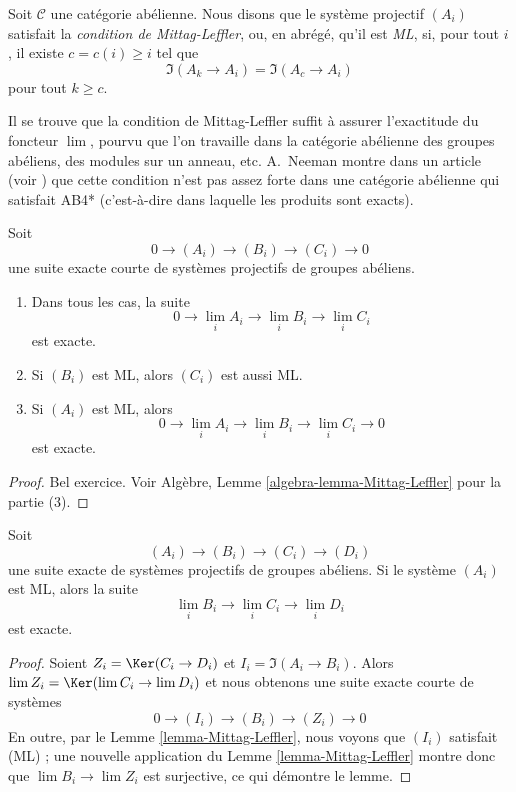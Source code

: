 \begin{definition}
\label{definition-Mittag-Leffler}
Soit $\mathcal{C}$ une catégorie abélienne.
Nous disons que le système projectif $(A_i)$
satisfait la {\it condition de Mittag-Leffler}, ou, en abrégé, qu'il est
{\it ML}, si, pour tout $i$, il existe $c = c(i) \geq i$
tel que
$$
\Im(A_k \to A_i) = \Im(A_c \to A_i)
$$
pour tout $k \geq c$.
\end{definition}

\noindent
Il se trouve que la condition de Mittag-Leffler suffit à assurer
l'exactitude du foncteur $\lim$, pourvu que l'on travaille dans
la catégorie abélienne des groupes abéliens, des modules sur un anneau, etc.
A.\ Neeman montre dans un article (voir \cite{Neeman-Counterexample})
que cette condition n'est pas assez forte dans une catégorie abélienne
qui satisfait AB4* (c'est-à-dire dans laquelle les produits sont exacts).

\begin{lemma}
\label{lemma-Mittag-Leffler}
Soit
$$
0 \to (A_i) \to (B_i) \to (C_i) \to 0
$$
une suite exacte courte de systèmes projectifs de groupes abéliens.
\begin{enumerate}
\item Dans tous les cas, la suite
$$
0 \to \lim_i A_i \to \lim_i B_i \to \lim_i C_i
$$
est exacte.
\item Si $(B_i)$ est ML, alors $(C_i)$ est aussi ML.
\item Si $(A_i)$ est ML, alors
$$
0 \to \lim_i A_i \to \lim_i B_i \to \lim_i C_i \to 0
$$
est exacte.
\end{enumerate}
\end{lemma}

\begin{proof}
Bel exercice. Voir
Algèbre, Lemme \ref{algebra-lemma-Mittag-Leffler} pour la partie (3).
\end{proof}

\begin{lemma}
\label{lemma-apply-Mittag-Leffler}
Soit
$$
(A_i) \to (B_i) \to (C_i) \to (D_i)
$$
une suite exacte de systèmes projectifs de groupes abéliens. Si le
système $(A_i)$ est ML, alors la suite
$$
\lim_i B_i \to \lim_i C_i \to \lim_i D_i
$$
est exacte.
\end{lemma}

\begin{proof}
Soient $Z_i = \Ker(C_i \to D_i)$ et $I_i = \Im(A_i \to B_i)$.
Alors $\lim Z_i = \Ker(\lim C_i \to \lim D_i)$ et
nous obtenons une suite exacte courte de systèmes
$$
0 \to (I_i) \to (B_i) \to (Z_i) \to 0
$$
En outre, par le
Lemme \ref{lemma-Mittag-Leffler},
nous voyons que $(I_i)$ satisfait (ML) ; une nouvelle application du
Lemme \ref{lemma-Mittag-Leffler}
montre donc que $\lim B_i \to \lim Z_i$ est surjective, ce qui
démontre le lemme.
\end{proof}

